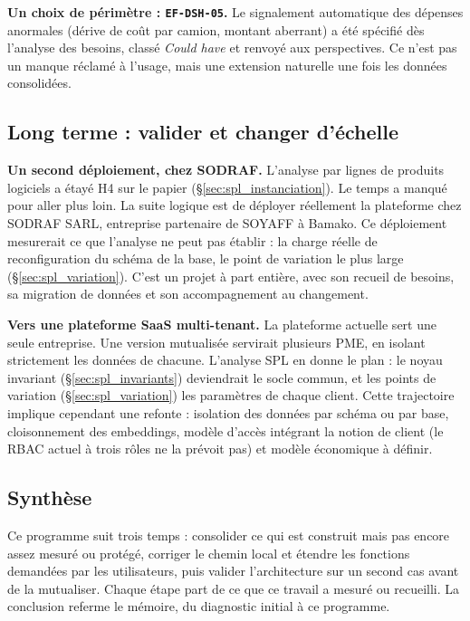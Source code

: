 \textbf{Un choix de périmètre : \texttt{EF-DSH-05}.} Le signalement automatique des dépenses anormales (dérive de coût par camion, montant aberrant) a été spécifié dès l'analyse des besoins, classé \textit{Could have} et renvoyé aux perspectives. Ce n'est pas un manque réclamé à l'usage, mais une extension naturelle une fois les données consolidées.

\subsection{Long terme : valider et changer d'échelle}
\label{sec:persp_long}

\textbf{Un second déploiement, chez SODRAF.} L'analyse par lignes de produits logiciels a étayé H4 sur le papier (§\ref{sec:spl_instanciation}). Le temps a manqué pour aller plus loin. La suite logique est de déployer réellement la plateforme chez SODRAF SARL, entreprise partenaire de SOYAFF à Bamako. Ce déploiement mesurerait ce que l'analyse ne peut pas établir : la charge réelle de reconfiguration du schéma de la base, le point de variation le plus large (§\ref{sec:spl_variation}). C'est un projet à part entière, avec son recueil de besoins, sa migration de données et son accompagnement au changement.

\textbf{Vers une plateforme SaaS multi-tenant.} La plateforme actuelle sert une seule entreprise. Une version mutualisée servirait plusieurs PME, en isolant strictement les données de chacune. L'analyse SPL en donne le plan : le noyau invariant (\S\ref{sec:spl_invariants}) deviendrait le socle commun, et les points de variation (\S\ref{sec:spl_variation}) les paramètres de chaque client. Cette trajectoire implique cependant une refonte : isolation des données par schéma ou par base, cloisonnement des embeddings, modèle d'accès intégrant la notion de client (le RBAC actuel à trois rôles ne la prévoit pas) et modèle économique à définir.

\subsection{Synthèse}
\label{sec:persp_synthese}

Ce programme suit trois temps : consolider ce qui est construit mais pas encore assez mesuré ou protégé, corriger le chemin local et étendre les fonctions demandées par les utilisateurs, puis valider l'architecture sur un second cas avant de la mutualiser. Chaque étape part de ce que ce travail a mesuré ou recueilli. La conclusion referme le mémoire, du diagnostic initial à ce programme.
